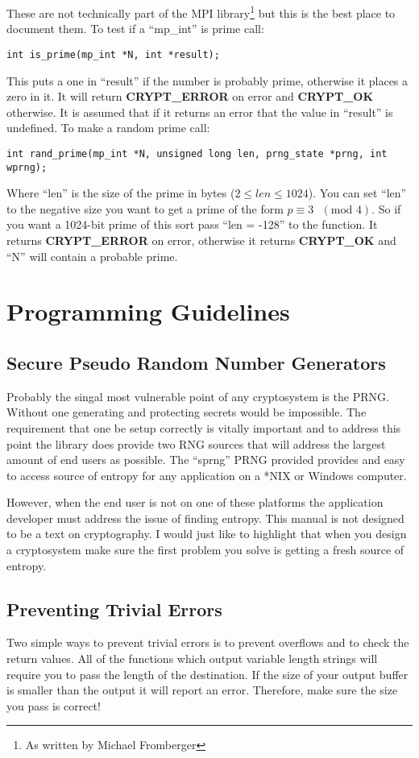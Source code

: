 \documentclass{book}
\begin{document}
These are not technically part of the MPI
library\footnote{As written by Michael Fromberger} but this is the best place to document them.  To test if a ``mp\_int'' is
prime call:
\begin{verbatim}
int is_prime(mp_int *N, int *result);
\end{verbatim}
This puts a one in ``result'' if the number is probably prime, otherwise it places a zero in it.  It will return {\bf CRYPT\_ERROR} on error
and {\bf CRYPT\_OK} otherwise.  It is assumed that if it returns an error that the value in ``result'' is undefined.  To make 
a random prime call:
\begin{verbatim}
int rand_prime(mp_int *N, unsigned long len, prng_state *prng, int wprng);
\end{verbatim}
Where ``len'' is the size of the prime in bytes ($2 \le len \le 1024$).  You can set ``len'' to the negative size you want
to get a prime of the form $p \equiv 3\mbox{ }(\mbox{mod } 4)$.  So if you want a 1024-bit prime of this sort pass 
``len = -128'' to the function.  It returns {\bf CRYPT\_ERROR} on error, otherwise it returns {\bf CRYPT\_OK} and ``N'' will
contain a probable prime.

\chapter{Programming Guidelines}

\section{Secure Pseudo Random Number Generators}
Probably the singal most vulnerable point of any cryptosystem is the PRNG.  Without one generating and protecting secrets
would be impossible.  The requirement that one be setup correctly is vitally important and to address this point the library
does provide two RNG sources that will address the largest amount of end users as possible.  The ``sprng'' PRNG provided 
provides and easy to access source of entropy for any application on a *NIX or Windows computer.  

However, when the end user is not on one of these platforms the application developer must address the issue of finding
entropy.  This manual is not designed to be a text on cryptography.  I would just like to highlight that when you design
a cryptosystem make sure the first problem you solve is getting a fresh source of entropy.  

\section{Preventing Trivial Errors}
Two simple ways to prevent trivial errors is to prevent overflows and to check the return values.  All of the functions
which output variable length strings will require you to pass the length of the destination.  If the size of your output
buffer is smaller than the output it will report an error.  Therefore, make sure the size you pass is correct!
\end{document}

